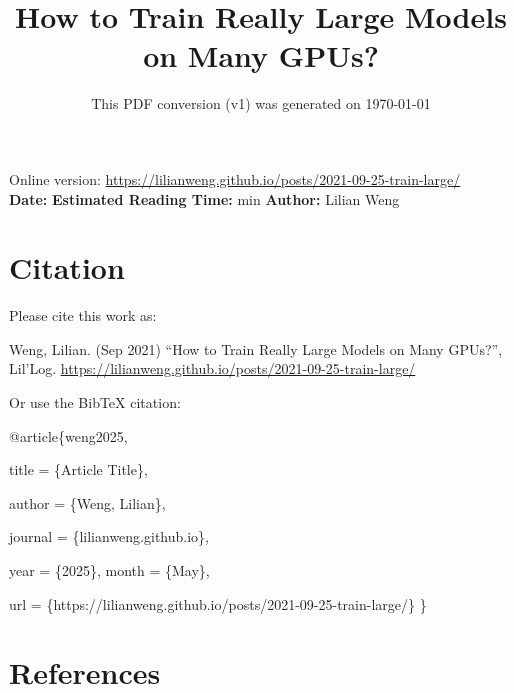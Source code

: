 \documentclass[12pt]{article}
\title{How to Train Really Large Models on Many GPUs?}
\date{This PDF conversion (v1) was generated on \today\footnotemark}
\begin{document}
\maketitle
\begin{center}
    Online version: \url{https://lilianweng.github.io/posts/2021-09-25-train-large/} \\
    \textbf{Date:} \quad
    \textbf{Estimated Reading Time:}  min \quad
    \textbf{Author:} Lilian Weng
\end{center}




\newpage
\tableofcontents
\newpage
\vspace{1em}
\n\n\n\section{Citation}
Please cite this work as:

\begin{tcolorbox}[colback=black!5!white, colframe=black!80!white, boxrule=0.5pt, arc=2mm, left=1mm, right=1mm, top=1mm, bottom=1mm]
  Weng, Lilian. (Sep 2021) ``How to Train Really Large Models on Many GPUs?'', Lil'Log. \url{https://lilianweng.github.io/posts/2021-09-25-train-large/}
  \end{tcolorbox}

Or use the BibTeX citation:

\begin{tcolorbox}[
    colback=black!5!white,
    colframe=black!80!white,
    boxrule=0.5pt,
    arc=2mm,
    left=1mm,
    right=1mm,
    top=1mm,
    bottom=1mm,
    listing only,
    listing options={
      basicstyle=\ttfamily\footnotesize,
      breaklines=true,
      literate={\{}{{\char`\{}}1 {\}}{{\char`\}}}1
    }
  ]
  @article\{weng2025,

    title   = \{Article Title\},

    author  = \{Weng, Lilian\},

    journal = \{lilianweng.github.io\},

    year    = \{2025\},
    month   = \{May\},

    url     = \{https://lilianweng.github.io/posts/2021-09-25-train-large/\}\n
  \}
  \end{tcolorbox}

\newpage
\section{References}

\n
\end{document}
